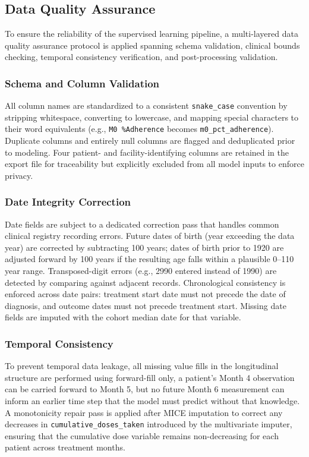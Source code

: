 \documentclass[12pt]{article}
\begin{document}
\subsection{Data Quality Assurance}

To ensure the reliability of the supervised learning pipeline, a multi-layered data quality assurance protocol is applied spanning schema validation, clinical bounds checking, temporal consistency verification, and post-processing validation.

\subsubsection*{Schema and Column Validation}

All column names are standardized to a consistent \texttt{snake\_case} convention by stripping whitespace, converting to lowercase, and mapping special characters to their word equivalents (e.g., \texttt{M0 \%Adherence} becomes \texttt{m0\_pct\_adherence}). Duplicate columns and entirely null columns are flagged and deduplicated prior to modeling. Four patient- and facility-identifying columns are retained in the export file for traceability but explicitly excluded from all model inputs to enforce privacy.

\subsubsection*{Date Integrity Correction}

Date fields are subject to a dedicated correction pass that handles common clinical registry recording errors. Future dates of birth (year exceeding the data year) are corrected by subtracting 100 years; dates of birth prior to 1920 are adjusted forward by 100 years if the resulting age falls within a plausible 0--110 year range. Transposed-digit errors (e.g., 2990 entered instead of 1990) are detected by comparing against adjacent records. Chronological consistency is enforced across date pairs: treatment start date must not precede the date of diagnosis, and outcome dates must not precede treatment start. Missing date fields are imputed with the cohort median date for that variable.

\subsubsection*{Temporal Consistency}

To prevent temporal data leakage, all missing value fills in the longitudinal structure are performed using forward-fill only, a patient's Month 4 observation can be carried forward to Month 5, but no future Month 6 measurement can inform an earlier time step that the model must predict without that knowledge. A monotonicity repair pass is applied after MICE imputation to correct any decreases in \texttt{cumulative\_doses\_taken} introduced by the multivariate imputer, ensuring that the cumulative dose variable remains non-decreasing for each patient across treatment months.
\end{document}
